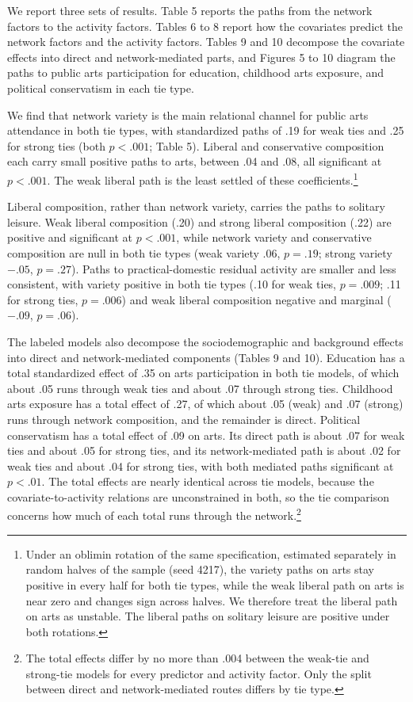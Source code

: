 \documentclass[
  12pt
]{article}
\begin{document}
We report three sets of results. Table 5 reports the paths from the network factors to the activity factors. Tables 6 to 8 report how the covariates predict the network factors and the activity factors. Tables 9 and 10 decompose the covariate effects into direct and network-mediated parts, and Figures 5 to 10 diagram the paths to public arts participation for education, childhood arts exposure, and political conservatism in each tie type.

We find that network variety is the main relational channel for public arts attendance in both tie types, with standardized paths of .19 for weak ties and .25 for strong ties (both $p < .001$; Table 5). Liberal and conservative composition each carry small positive paths to arts, between .04 and .08, all significant at $p < .001$. The weak liberal path is the least settled of these coefficients.\footnote{Under an oblimin rotation of the same specification, estimated separately in random halves of the sample (seed 4217), the variety paths on arts stay positive in every half for both tie types, while the weak liberal path on arts is near zero and changes sign across halves. We therefore treat the liberal path on arts as unstable. The liberal paths on solitary leisure are positive under both rotations.}

Liberal composition, rather than network variety, carries the paths to solitary leisure. Weak liberal composition (.20) and strong liberal composition (.22) are positive and significant at $p < .001$, while network variety and conservative composition are null in both tie types (weak variety .06, $p = .19$; strong variety $-.05$, $p = .27$). Paths to practical-domestic residual activity are smaller and less consistent, with variety positive in both tie types (.10 for weak ties, $p = .009$; .11 for strong ties, $p = .006$) and weak liberal composition negative and marginal ($-.09$, $p = .06$).

The labeled models also decompose the sociodemographic and background effects into direct and network-mediated components (Tables 9 and 10). Education has a total standardized effect of .35 on arts participation in both tie models, of which about .05 runs through weak ties and about .07 through strong ties. Childhood arts exposure has a total effect of .27, of which about .05 (weak) and .07 (strong) runs through network composition, and the remainder is direct. Political conservatism has a total effect of .09 on arts. Its direct path is about .07 for weak ties and about .05 for strong ties, and its network-mediated path is about .02 for weak ties and about .04 for strong ties, with both mediated paths significant at $p < .01$. The total effects are nearly identical across tie models, because the covariate-to-activity relations are unconstrained in both, so the tie comparison concerns how much of each total runs through the network.\footnote{The total effects differ by no more than .004 between the weak-tie and strong-tie models for every predictor and activity factor. Only the split between direct and network-mediated routes differs by tie type.}
\end{document}
